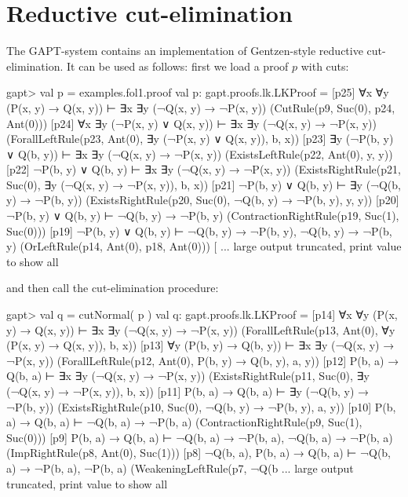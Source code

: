 \documentclass[a4paper,11pt]{book}
\begin{document}
\section{Reductive cut-elimination}

The GAPT-system contains an implementation of Gentzen-style reductive
cut-elimination.  It can be used as follows: first we load a proof $p$ with
cuts:

\begin{clilisting}
  gapt> val p = examples.fol1.proof
  val p: gapt.proofs.lk.LKProof = [p25] ∀x ∀y (P(x, y) → Q(x, y)) ⊢ ∃x ∃y (¬Q(x, y) → ¬P(x, y))    (CutRule(p9, Suc(0), p24, Ant(0)))
  [p24] ∀x ∃y (¬P(x, y) ∨ Q(x, y)) ⊢ ∃x ∃y (¬Q(x, y) → ¬P(x, y))    (ForallLeftRule(p23, Ant(0), ∃y (¬P(x, y) ∨ Q(x, y)), b, x))
  [p23] ∃y (¬P(b, y) ∨ Q(b, y)) ⊢ ∃x ∃y (¬Q(x, y) → ¬P(x, y))    (ExistsLeftRule(p22, Ant(0), y, y))
  [p22] ¬P(b, y) ∨ Q(b, y) ⊢ ∃x ∃y (¬Q(x, y) → ¬P(x, y))    (ExistsRightRule(p21, Suc(0), ∃y (¬Q(x, y) → ¬P(x, y)), b, x))
  [p21] ¬P(b, y) ∨ Q(b, y) ⊢ ∃y (¬Q(b, y) → ¬P(b, y))    (ExistsRightRule(p20, Suc(0), ¬Q(b, y) → ¬P(b, y), y, y))
  [p20] ¬P(b, y) ∨ Q(b, y) ⊢ ¬Q(b, y) → ¬P(b, y)    (ContractionRightRule(p19, Suc(1), Suc(0)))
  [p19] ¬P(b, y) ∨ Q(b, y) ⊢ ¬Q(b, y) → ¬P(b, y), ¬Q(b, y) → ¬P(b, y)    (OrLeftRule(p14, Ant(0), p18, Ant(0)))
  [ ... large output truncated, print value to show all

\end{clilisting}
%
and then call the cut-elimination procedure:
\begin{clilisting}
  gapt> val q = cutNormal( p )
  val q: gapt.proofs.lk.LKProof = [p14] ∀x ∀y (P(x, y) → Q(x, y)) ⊢ ∃x ∃y (¬Q(x, y) → ¬P(x, y))    (ForallLeftRule(p13, Ant(0), ∀y (P(x, y) → Q(x, y)), b, x))
  [p13] ∀y (P(b, y) → Q(b, y)) ⊢ ∃x ∃y (¬Q(x, y) → ¬P(x, y))    (ForallLeftRule(p12, Ant(0), P(b, y) → Q(b, y), a, y))
  [p12] P(b, a) → Q(b, a) ⊢ ∃x ∃y (¬Q(x, y) → ¬P(x, y))    (ExistsRightRule(p11, Suc(0), ∃y (¬Q(x, y) → ¬P(x, y)), b, x))
  [p11] P(b, a) → Q(b, a) ⊢ ∃y (¬Q(b, y) → ¬P(b, y))    (ExistsRightRule(p10, Suc(0), ¬Q(b, y) → ¬P(b, y), a, y))
  [p10] P(b, a) → Q(b, a) ⊢ ¬Q(b, a) → ¬P(b, a)    (ContractionRightRule(p9, Suc(1), Suc(0)))
  [p9] P(b, a) → Q(b, a) ⊢ ¬Q(b, a) → ¬P(b, a), ¬Q(b, a) → ¬P(b, a)    (ImpRightRule(p8, Ant(0), Suc(1)))
  [p8] ¬Q(b, a), P(b, a) → Q(b, a) ⊢ ¬Q(b, a) → ¬P(b, a), ¬P(b, a)    (WeakeningLeftRule(p7, ¬Q(b ... large output truncated, print value to show all

\end{clilisting}
\end{document}

